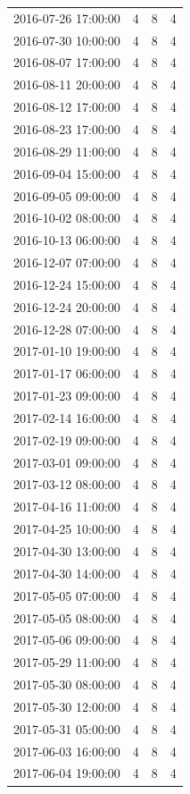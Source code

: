 \begin{tabular}{lrrr}
2016-07-26 17:00:00 & 4 & 8 & 4 \\
2016-07-30 10:00:00 & 4 & 8 & 4 \\
2016-08-07 17:00:00 & 4 & 8 & 4 \\
2016-08-11 20:00:00 & 4 & 8 & 4 \\
2016-08-12 17:00:00 & 4 & 8 & 4 \\
2016-08-23 17:00:00 & 4 & 8 & 4 \\
2016-08-29 11:00:00 & 4 & 8 & 4 \\
2016-09-04 15:00:00 & 4 & 8 & 4 \\
2016-09-05 09:00:00 & 4 & 8 & 4 \\
2016-10-02 08:00:00 & 4 & 8 & 4 \\
2016-10-13 06:00:00 & 4 & 8 & 4 \\
2016-12-07 07:00:00 & 4 & 8 & 4 \\
2016-12-24 15:00:00 & 4 & 8 & 4 \\
2016-12-24 20:00:00 & 4 & 8 & 4 \\
2016-12-28 07:00:00 & 4 & 8 & 4 \\
2017-01-10 19:00:00 & 4 & 8 & 4 \\
2017-01-17 06:00:00 & 4 & 8 & 4 \\
2017-01-23 09:00:00 & 4 & 8 & 4 \\
2017-02-14 16:00:00 & 4 & 8 & 4 \\
2017-02-19 09:00:00 & 4 & 8 & 4 \\
2017-03-01 09:00:00 & 4 & 8 & 4 \\
2017-03-12 08:00:00 & 4 & 8 & 4 \\
2017-04-16 11:00:00 & 4 & 8 & 4 \\
2017-04-25 10:00:00 & 4 & 8 & 4 \\
2017-04-30 13:00:00 & 4 & 8 & 4 \\
2017-04-30 14:00:00 & 4 & 8 & 4 \\
2017-05-05 07:00:00 & 4 & 8 & 4 \\
2017-05-05 08:00:00 & 4 & 8 & 4 \\
2017-05-06 09:00:00 & 4 & 8 & 4 \\
2017-05-29 11:00:00 & 4 & 8 & 4 \\
2017-05-30 08:00:00 & 4 & 8 & 4 \\
2017-05-30 12:00:00 & 4 & 8 & 4 \\
2017-05-31 05:00:00 & 4 & 8 & 4 \\
2017-06-03 16:00:00 & 4 & 8 & 4 \\
2017-06-04 19:00:00 & 4 & 8 & 4 \\

\end{tabular}
